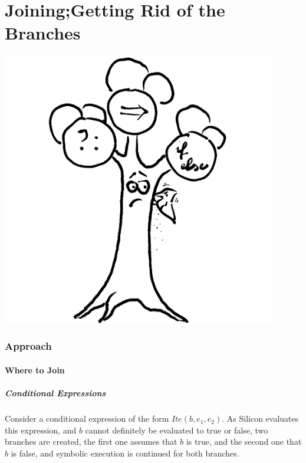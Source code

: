 \documentclass[11pt]{article}
\begin{document}
    \part{Joining;\newline Getting Rid of the Branches}
    \begin{center}
        \vspace{2cm}
        \includegraphics[width=0.9\textwidth]{tree}
    \end{center}

    \newpage
    \section{Approach}

    \subsection{Where to Join}

    \subsubsection{Conditional Expressions}

    Consider a conditional expression of the form $Ite(b, e_1, e_2)$.
    As Silicon evaluates this expression, and $b$ cannot definitely be evaluated to true or false,
    two branches are created, the first one assumes that $b$
    is true, and the second one that $b$ is false, and symbolic execution is continued for both branches.
\end{document}
